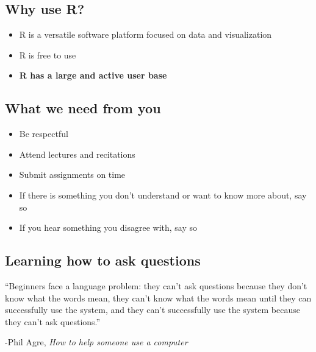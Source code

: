 \documentclass[
  letterpaper,
  DIV=11,
  numbers=noendperiod]{scrartcl}
\begin{document}
\hypertarget{why-use-r}{%
\subsection{Why use R?}\label{why-use-r}}

\begin{itemize}
\item
  R is a versatile software platform focused on data and visualization
\item
  R is free to use
\item
  \textbf{R has a large and active user base}
\end{itemize}

\hypertarget{what-we-need-from-you}{%
\subsection{What we need from you}\label{what-we-need-from-you}}

\begin{itemize}
\item
  Be respectful
\item
  Attend lectures and recitations
\item
  Submit assignments on time
\item
  If there is something you don't understand or want to know more about,
  say so
\item
  If you hear something you disagree with, say so
\end{itemize}

\hypertarget{learning-how-to-ask-questions}{%
\subsection{Learning how to ask
questions}\label{learning-how-to-ask-questions}}

``Beginners face a language problem: they can't ask questions because
they don't know what the words mean, they can't know what the words mean
until they can successfully use the system, and they can't successfully
use the system because they can't ask questions.''

-Phil Agre, \emph{How to help someone use a computer}
\end{document}
